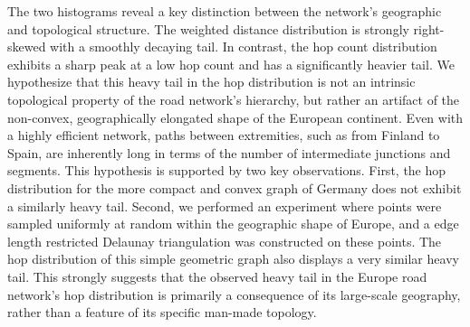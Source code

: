 The two histograms reveal a key distinction between the network's geographic and topological structure.
The weighted distance distribution is strongly right-skewed with a smoothly decaying tail.
In contrast, the hop count distribution exhibits a sharp peak at a low hop count and has a significantly heavier tail.
We hypothesize that this heavy tail in the hop distribution is not an intrinsic topological property of the road network's hierarchy, but rather an artifact of the non-convex, geographically elongated shape of the European continent.
Even with a highly efficient network, paths between extremities, such as from Finland to Spain, are inherently long in terms of the number of intermediate junctions and segments.
This hypothesis is supported by two key observations.
First, the hop distribution for the more compact and convex graph of Germany does not exhibit a similarly heavy tail.
Second, we performed an experiment where points were sampled uniformly at random within the geographic shape of Europe, and a edge length restricted Delaunay triangulation was constructed on these points.
The hop distribution of this simple geometric graph also displays a very similar heavy tail.
This strongly suggests that the observed heavy tail in the Europe road network's hop distribution is primarily a consequence of its large-scale geography, rather than a feature of its specific man-made topology.


